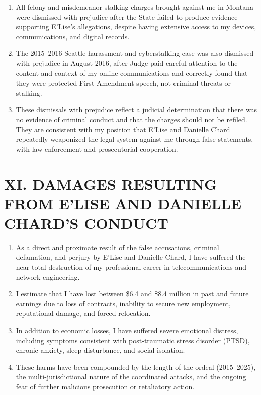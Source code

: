 \documentclass[12pt,letterpaper]{article}
\begin{document}
\begin{enumerate}

\item All felony and misdemeanor stalking charges brought against me in Montana were dismissed with prejudice after the State failed to produce evidence supporting E'Lise's allegations, despite having extensive access to my devices, communications, and digital records.

\item The 2015--2016 Seattle harassment and cyberstalking case was also dismissed with prejudice in August 2016, after Judge paid careful attention to the content and context of my online communications and correctly found that they were protected First Amendment speech, not criminal threats or stalking.

\item These dismissals with prejudice reflect a judicial determination that there was no evidence of criminal conduct and that the charges should not be refiled. They are consistent with my position that E'Lise and Danielle Chard repeatedly weaponized the legal system against me through false statements, with law enforcement and prosecutorial cooperation.

\end{enumerate}

\section*{XI. DAMAGES RESULTING FROM E'LISE AND DANIELLE CHARD'S CONDUCT}

\begin{enumerate}

\item As a direct and proximate result of the false accusations, criminal defamation, and perjury by E'Lise and Danielle Chard, I have suffered the near-total destruction of my professional career in telecommunications and network engineering.

\item I estimate that I have lost between \$6.4 and \$8.4 million in past and future earnings due to loss of contracts, inability to secure new employment, reputational damage, and forced relocation.

\item In addition to economic losses, I have suffered severe emotional distress, including symptoms consistent with post-traumatic stress disorder (PTSD), chronic anxiety, sleep disturbance, and social isolation.

\item These harms have been compounded by the length of the ordeal (2015--2025), the multi-jurisdictional nature of the coordinated attacks, and the ongoing fear of further malicious prosecution or retaliatory action.

\end{enumerate}
\end{document}
